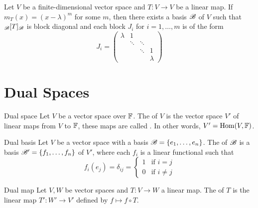 \documentclass{styles/tufte}
\begin{document}
\begin{corollary}{}{}
  Let $V$ be a finite-dimensional vector space and $T: V \to V$ be a linear map. If $m_T(x) = (x - \lambda)^m$ for some $m$, then there exists a basis $\mathscr{B}$ of $V$ such that ${}_{\mathscr{B}}[T]_{\mathscr{B}}$ is block diagonal and each block $J_i$ for $i = 1, \dots, m$ is of the form
  \[ J_i = \begin{pmatrix}
    \lambda & 1 & & \\
    & \ddots & \ddots & \\
    & & \ddots & 1 \\
    & & & \lambda
  \end{pmatrix} \]
\end{corollary}

\begin{theorem}{}{}
  
\end{theorem}



\section{Dual Spaces}

\begin{definition}{Dual space}{}
  Let $V$ be a vector space over $\mathbb{F}$. The  of $V$ is the vector space $V'$ of linear maps from $V$ to $\mathbb{F}$, these maps are called . In other words, $V' = \operatorname{Hom}(V, \mathbb{F})$.
\end{definition}

\begin{definition}{Dual basis}{}
  Let $V$ be a vector space with a basis $\mathscr{B} = \set{e_1, \dots, e_n}$. The  of $\mathscr{B}$ is a basis $\mathscr{B}' = \set{f_1, \dots, f_n}$ of $V'$, where each $f_i$ is a linear functional such that
  \[ f_i(e_j) = \delta_{ij} = \begin{cases} 1 & \text{if $i = j$} \\ 0 & \text{if $i \neq j$} \end{cases} \]
\end{definition}

\begin{definition}{Dual map}{}
  Let $V, W$ be vector spaces and $T: V \to W$ a linear map. The  of $T$ is the linear map $T': W' \to V'$ defined by $f \mapsto f \circ T$.
\end{definition}
\end{document}
